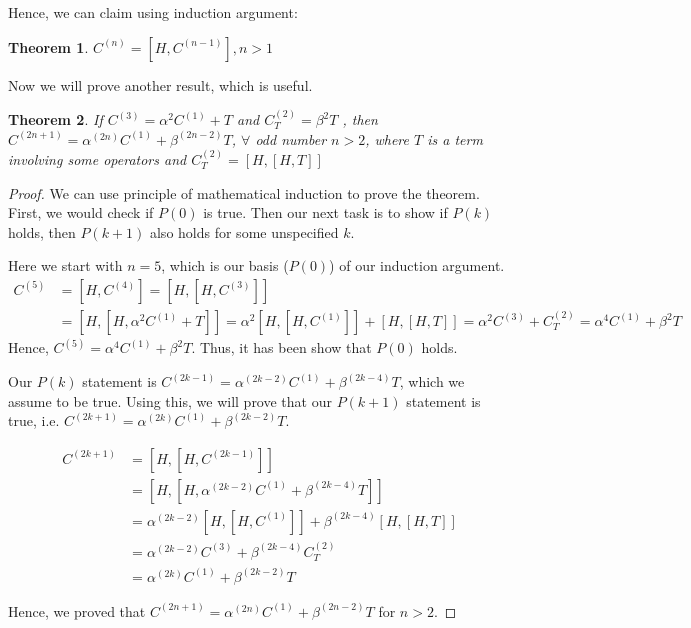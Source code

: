 \documentclass[11pt,a4paper]{article}
\newtheorem{thm}{Theorem}
\begin{document}
Hence, we can claim using induction argument:

\begin{thm}
$C^{(n)}= [H, C^{(n-1)}], n>1$
\end{thm}


Now we will prove another result, which is useful.
\begin{thm}
If $C^{(3)}=  \alpha^2  C^{(1)} + T$ and $C^{(2)}_T= \beta^2 T $ , then $C^{(2n+1)}= \alpha^{(2n)} C^{(1)} + \beta^{(2n-2)} T$, $\forall$ odd number $n>2$,  where $T$ is a term involving some operators and $ C^{(2)}_T=[H, [H, T]]$
\end{thm}

\begin{proof}
We can use principle of mathematical induction to prove the theorem. First, we would check if $P(0)$ is true. Then our next task is to show if $P(k)$ holds, then  $P(k + 1)$ also holds for some unspecified $k$.



Here we start with $n=5$, which is our basis ($P(0)$) of our induction argument.
\begin{align*}
C^{(5)} &= [H, C^{(4)}]=[H, [H,C^{(3)}]] \\
&=[H, [H,\alpha^2  C^{(1)} + T]]= \alpha^2[H, [H,  C^{(1)}]] +[H, [H, T]]= \alpha^2 C^{(3)} +C^{(2)}_T =  \alpha^4 C^{(1)} +\beta^2 T 
\end{align*} 
Hence, $C^{(5)}= \alpha^4 C^{(1)}  +\beta^2 T$. Thus, it has been show that $P(0)$ holds.


Our  $P(k)$ statement is $C^{(2k-1)}= \alpha^{(2k-2)} C^{(1)} + \beta^{(2k-4)} T$, which we assume to be true. Using this, we will prove that our $P(k+1)$ statement is true, i.e.  $C^{(2k+1)}= \alpha^{(2k)} C^{(1)} + \beta^{(2k-2)} T$.

\begin{align*}
C^{(2k+1)} &=[H, [H,C^{(2k-1)}]] \\
&=[H, [H, \alpha^{(2k-2)} C^{(1)} + \beta^{(2k-4)} T]] \\
&= \alpha^{(2k-2)}[H, [H,  C^{(1)}]] + \beta^{(2k-4)} [H, [H, T]]\\
&= \alpha^{(2k-2)} C^{(3)} + \beta^{(2k-4)} C^{(2)}_T \\
&= \alpha^{(2k)} C^{(1)} + \beta^{(2k-2)} T
\end{align*} 

Hence, we  proved that $C^{(2n+1)}= \alpha^{(2n)} C^{(1)} + \beta^{(2n-2)} T$ for $n>2$.
\end{proof}
\end{document}
